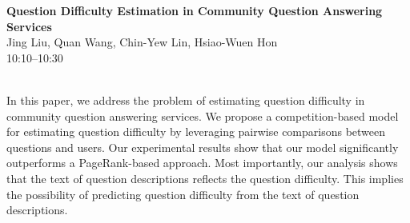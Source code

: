\documentclass[twoside,makeidx]{book}
\begin{document}
\par\vspace{2em}\noindent%
\begin{minipage}{\linewidth}%
\begin{center}
\textbf{\normalsize Question Difficulty Estimation in Community Question Answering Services}\\
\normalsize  Jing Liu,  Quan Wang,  Chin-Yew Lin,  Hsiao-Wuen Hon\\
{\small 10:10--10:30}\\
\end{center}
\end{minipage}\\[0.5em]
\nopagebreak%
\noindent%
{\small In this paper, we address the problem of estimating question difficulty in community question answering services. We propose a competition-based model for estimating question difficulty by leveraging pairwise comparisons between questions and users. Our experimental results show that our model significantly outperforms a PageRank-based approach. Most importantly, our analysis shows that the text of question descriptions reflects the question difficulty. This implies the possibility of predicting question difficulty from the text of question descriptions.}
\clearpage
\end{document}
